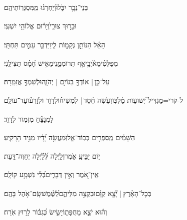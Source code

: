 \documentclass[12pt]{article}
\newcommand{\loc}[1]{\textsuperscript{\locf{#1}}}
\begin{document}
{\loc{ מו}~}‏בְּנֵי־נֵכָ֥ר יִבֹּ֑לוּ{\hfill}וְ֝יַחְרְג֗וּ מִֽמִּסְגְּרֽוֹתֵיהֶֽם׃\par

{\loc{ מז}~}‏ וּבָר֣וּךְ צוּרִ֑י{\hfill}וְ֝יָר֗וּם אֱלוֹהֵ֥י יִשְׁעִֽי׃\par

{\loc{ מח}~}‏הָאֵ֗ל הַנּוֹתֵ֣ן נְקָמ֣וֹת לִ֑י{\hfill}וַיַּדְבֵּ֖ר עַמִּ֣ים תַּחְתָּֽי׃\par

{\loc{ מט}~}‏מְפַלְּטִ֗י{\hfill}מֵאֹ֫יְבָ֥י\newline\hspace*{.5em}אַ֣ף  תְּרוֹמְמֵ֑נִי{\hfill}מֵאִ֥ישׁ חָ֝מָ֗ס תַּצִּילֵֽנִי׃\par

{\loc{ נ}~}‏עַל־כֵּ֤ן |  אוֹדְךָ֖ בַגּוֹיִ֥ם | יְהֹוָ֑ה{\hfill}וּלְשִׁמְךָ֥ אֲזַמֵּֽרָה׃\par

{\loc{ נא}~}‏ל-קרי=מַגְדִּיל֮ יְשׁוּע֢וֹת מַ֫לְכּ֥וֹ{\hfill}וְעֹ֤שֶׂה חֶ֨סֶד |  לִמְשִׁיח֗וֹ\newline\hspace*{.5em}לְדָוִ֥ד וּלְזַרְע֗וֹ{\hfill}עַד־עוֹלָֽם׃\par\pend
\ledpb
\pstart[\subsection*{\textcolor{red}{פרק יט}}]\label{פרק יט}
{\loc{ א}~}‏לַמְנַצֵּ֗חַ מִזְמ֥וֹר לְדָוִֽד׃\par

{\loc{ ב}~}‏הַשָּׁמַ֗יִם מְֽסַפְּרִ֥ים כְּבֽוֹד־אֵ֑ל{\hfill}וּֽמַעֲשֵׂ֥ה יָ֝דָ֗יו מַגִּ֥יד הָרָקִֽיעַ׃\par

{\loc{ ג}~}‏י֣וֹם  יַבִּ֣יעַֽ אֹ֑מֶר{\hfill}וְלַ֥יְלָה לְּ֝לַ֗יְלָה יְחַוֶּה־דָּֽעַת׃\par

{\loc{ ד}~}‏אֵֽין־אֹ֭מֶר וְאֵ֣ין דְּבָרִ֑ים{\hfill}בְּ֝לִ֗י נִשְׁמָ֥ע קוֹלָֽם׃\par

{\loc{ ה}~}‏בְּכׇל־הָאָ֨רֶץ |  יָ֘צָ֤א קַוָּ֗ם{\hfill}וּבִקְצֵ֣ה  מִלֵּיהֶ֑ם\newline\hspace*{.5em}לַ֝שֶּׁ֗מֶשׁ{\hfill}שָֽׂם־אֹ֥הֶל בָּהֶֽם׃\par

{\loc{ ו}~}‏וְה֗וּא  יֹצֵ֣א מֵחֻפָּת֑וֹ{\hfill}יָשִׂ֥ישׂ כְּ֝גִבּ֗וֹר לָר֥וּץ אֹֽרַח׃\par
\end{document}
